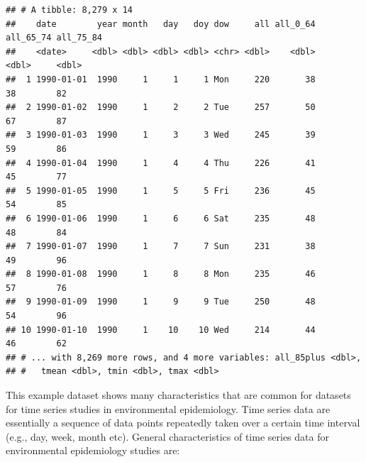 \documentclass[
]{book}
\begin{document}
\begin{verbatim}
## # A tibble: 8,279 x 14
##    date        year month   day   doy dow     all all_0_64 all_65_74 all_75_84
##    <date>     <dbl> <dbl> <dbl> <dbl> <chr> <dbl>    <dbl>     <dbl>     <dbl>
##  1 1990-01-01  1990     1     1     1 Mon     220       38        38        82
##  2 1990-01-02  1990     1     2     2 Tue     257       50        67        87
##  3 1990-01-03  1990     1     3     3 Wed     245       39        59        86
##  4 1990-01-04  1990     1     4     4 Thu     226       41        45        77
##  5 1990-01-05  1990     1     5     5 Fri     236       45        54        85
##  6 1990-01-06  1990     1     6     6 Sat     235       48        48        84
##  7 1990-01-07  1990     1     7     7 Sun     231       38        49        96
##  8 1990-01-08  1990     1     8     8 Mon     235       46        57        76
##  9 1990-01-09  1990     1     9     9 Tue     250       48        54        96
## 10 1990-01-10  1990     1    10    10 Wed     214       44        46        62
## # ... with 8,269 more rows, and 4 more variables: all_85plus <dbl>,
## #   tmean <dbl>, tmin <dbl>, tmax <dbl>
\end{verbatim}

This example dataset shows many characteristics that are common for datasets for
time series studies in environmental epidemiology. Time series data are essentially
a sequence of data points repeatedly taken over a certain time interval (e.g., day,
week, month etc). General characteristics of time series data for environmental epidemiology studies are:
\end{document}
